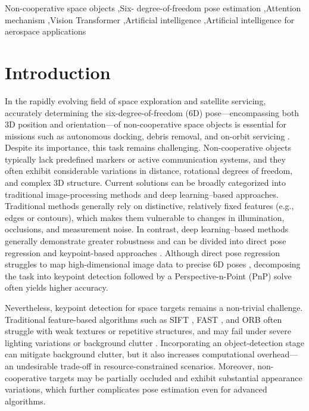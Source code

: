 \documentclass[a4paper,fleqn]{cas-sc}
\begin{document}
\begin{keywords}
Non-cooperative space objects \sep Six-
degree-of-freedom pose estimation
\sep Attention mechanism
\sep Vision Transformer
\sep Artificial intelligence
\sep Artificial intelligence for aerospace applications
\end{keywords}

\maketitle 

\section{Introduction}
In the rapidly evolving field of space exploration and satellite servicing, accurately determining the six-degree-of-freedom (6D) pose—encompassing both 3D position and orientation—of non-cooperative space objects is essential for missions such as autonomous docking, debris removal, and on-orbit servicing \citep{d2014pose,modelbased_algorithm,capuano2019robust}. Despite its importance, this task remains challenging.
Non-cooperative objects typically lack predefined markers or active communication systems, and they often exhibit considerable variations in distance, rotational degrees of freedom, and complex 3D structure. Current solutions can be broadly categorized into traditional image-processing methods and deep learning–based approaches. Traditional methods generally rely on distinctive, relatively fixed features (e.g., edges or contours), which makes them vulnerable to changes in illumination, occlusions, and measurement noise. In contrast, deep learning–based methods generally demonstrate greater robustness and can be divided into direct pose regression and keypoint-based approaches \citep{huan2020pose,park2019towards,wang2022revisiting}. Although direct pose regression struggles to map high-dimensional image data to precise 6D poses \citep{sharma2018pose,sharma2019pose}, decomposing the task into keypoint detection followed by a Perspective-n-Point (PnP) solve often yields higher accuracy.

Nevertheless, keypoint detection for space targets remains a non-trivial challenge. Traditional feature-based algorithms such as SIFT \citep{sift}, FAST \citep{fast}, and ORB \citep{orb} often struggle with weak textures or repetitive structures, and may fail under severe lighting variations or background clutter \citep{Dai2019Comparison,bojanic2019comparison}. Incorporating an object-detection stage \citep{chen2019satellite,park2019towards,black2021real,wang2022revisiting} can mitigate background clutter, but it also increases computational overhead—an undesirable trade-off in resource-constrained scenarios. Moreover, non-cooperative targets may be partially occluded and exhibit substantial appearance variations, which further complicates pose estimation even for advanced algorithms.
\end{document}
